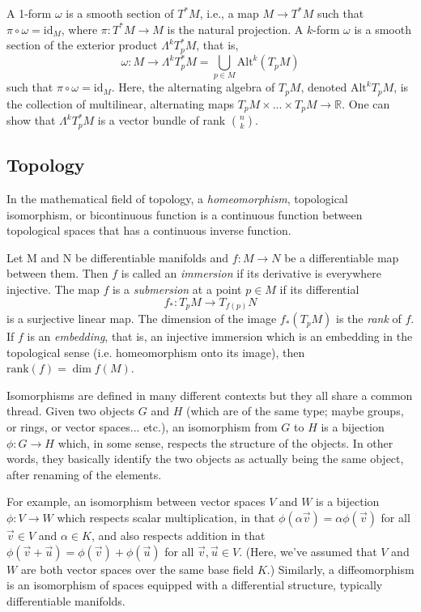 \documentclass{article}
\theoremstyle{plain}
\theoremstyle{definition}
\newcommand{\R}{\ensuremath{\mathbb{R}}}
\newcommand{\Alt}{\ensuremath{\mathrm{Alt}}}
\newcommand{\id}{\ensuremath{\mathrm{id}}}
\begin{document}
A 1-form $\omega$ is a smooth section of $T^*M$, i.e., a map $M\to T^*M$ such that $\pi\circ \omega=\id_M$, where $\pi:T^*M\to M$ is the natural projection. A $k$-form $\omega$ is a smooth section of the exterior product $\Lambda^kT_p^*M$, that is,
\[
 \omega:M\to \Lambda^kT_p^*M = \bigcup_{p\in M}\Alt^k(T_pM)
\]
such that $\pi\circ \omega=\id_M$. Here, the alternating algebra of $T_pM$, denoted $\Alt^kT_pM$, is the collection of multilinear, alternating maps $T_pM\times ...\times T_pM\to \R$. One can show that $\Lambda^kT_p^*M$ is a vector bundle of rank $\binom{n}{k}$.

\subsection{Topology}
In the mathematical field of topology, a \textit{homeomorphism}, topological isomorphism, or bicontinuous function is a continuous function between topological spaces that has a continuous inverse function.

Let M and N be differentiable manifolds and $f: M\to N$ be a differentiable map between them. Then $f$ is called an \textit{immersion} if its derivative is everywhere injective. The map $f$ is a \textit{submersion} at a point $p\in M$ if its differential
\[
f_*:T_pM\to T_{f(p)}N
\]
is a surjective linear map. The dimension of the image $f_*(T_pM)$ is the \textit{rank} of $f$. If $f$ is an \textit{embedding}, that is, an injective immersion which is an embedding in the topological sense (i.e. homeomorphism onto its image), then $\mathrm{rank}(f)=\dim f(M)$.

Isomorphisms are defined in many different contexts but they all share a common thread. Given two objects $G$ and $H$ (which are of the same type; maybe groups, or rings, or vector spaces... etc.), an isomorphism from $G$ to $H$ is a bijection $\phi:G\to H$ which, in some sense, respects the structure of the objects. In other words, they basically identify the two objects as actually being the same object, after renaming of the elements.

For example, an isomorphism between vector spaces $V$ and $W$ is a bijection $\phi:V\to W$ which respects scalar multiplication, in that $\phi(\alpha\vec{v})=\alpha\phi(\vec{v})$ for all $\vec{v}\in V$ and $\alpha\in K$, and also respects addition in that $\phi(\vec{v}+\vec{u})=\phi(\vec{v})+\phi(\vec{u})$ for all $\vec{v},\vec{u}\in V$. (Here, we've assumed that $V$ and $W$ are both vector spaces over the same base field $K$.) Similarly, a diffeomorphism is an isomorphism of spaces equipped with a differential structure, typically differentiable manifolds.
\end{document}
